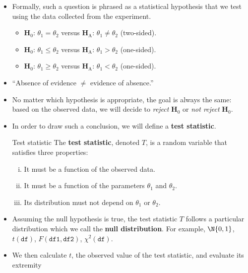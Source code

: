 \begin{itemize}
\begin{itemize}
          \end{itemize}
    \item Formally, such a question is phrased as a statistical hypothesis that we test using
          the data collected from the experiment.
          \begin{itemize}
              \item $ \mathbf{H}_0 $: $ \theta_1=\theta_2 $ versus $ \mathbf{H}_\text{A} $: $ \theta_1\ne\theta_2 $ (two-sided).
              \item $ \mathbf{H}_0 $: $ \theta_1\le\theta_2 $ versus $ \mathbf{H}_\text{A} $: $ \theta_1>\theta_2 $ (one-sided).
              \item $ \mathbf{H}_0 $: $ \theta_1\ge\theta_2 $ versus $ \mathbf{H}_\text{A} $: $ \theta_1<\theta_2 $ (one-sided).
          \end{itemize}
    \item ``Absence of evidence $ \ne  $ evidence of absence.''
    \item No matter which hypothesis is appropriate, the goal is always the same: based on the
          observed data, we will decide to \emph{reject} $ \mathbf{H}_0 $ or \emph{not reject} $ \mathbf{H}_0 $.
    \item In order to draw such a conclusion, we will define a \textbf{test statistic}.
          \begin{Definition}{Test statistic}{}
              The \textbf{test statistic}, denoted $ T $,
              is a random variable that satisfies three properties:
              \begin{enumerate}[(i)]
                  \item It must be a function of the observed data.
                  \item It must be a function of the parameters $ \theta_1 $ and $ \theta_2 $.
                  \item Its distribution must not depend on $ \theta_1 $ or $ \theta_2 $.
              \end{enumerate}
          \end{Definition}
    \item Assuming the null hypothesis is true, the test statistic $ T $ follows
          a particular distribution which we call the \textbf{null distribution}.
          For example, $ \N{0,1} $, $ t(\texttt{df}) $,
          $ F(\texttt{df1}, \texttt{df2}) $, $ \chi^2(\texttt{df}) $.
    \item We then calculate $ t $, the observed value of the test statistic, and evaluate its extremity

\end{itemize}
